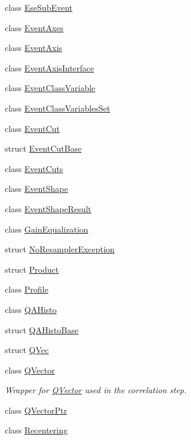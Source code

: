 \begin{DoxyCompactItemize}
class \mbox{\hyperlink{classQn_1_1EseSubEvent}{Ese\+Sub\+Event}}
\item 
class \mbox{\hyperlink{classQn_1_1EventAxes}{Event\+Axes}}
\item 
class \mbox{\hyperlink{classQn_1_1EventAxis}{Event\+Axis}}
\item 
class \mbox{\hyperlink{classQn_1_1EventAxisInterface}{Event\+Axis\+Interface}}
\item 
class \mbox{\hyperlink{classQn_1_1EventClassVariable}{Event\+Class\+Variable}}
\item 
class \mbox{\hyperlink{classQn_1_1EventClassVariablesSet}{Event\+Class\+Variables\+Set}}
\item 
class \mbox{\hyperlink{classQn_1_1EventCut}{Event\+Cut}}
\item 
struct \mbox{\hyperlink{structQn_1_1EventCutBase}{Event\+Cut\+Base}}
\item 
class \mbox{\hyperlink{classQn_1_1EventCuts}{Event\+Cuts}}
\item 
class \mbox{\hyperlink{classQn_1_1EventShape}{Event\+Shape}}
\item 
class \mbox{\hyperlink{classQn_1_1EventShapeResult}{Event\+Shape\+Result}}
\item 
class \mbox{\hyperlink{classQn_1_1GainEqualization}{Gain\+Equalization}}
\item 
struct \mbox{\hyperlink{structQn_1_1NoResamplerException}{No\+Resampler\+Exception}}
\item 
struct \mbox{\hyperlink{structQn_1_1Product}{Product}}
\item 
class \mbox{\hyperlink{classQn_1_1Profile}{Profile}}
\item 
class \mbox{\hyperlink{classQn_1_1QAHisto}{Q\+A\+Histo}}
\item 
struct \mbox{\hyperlink{structQn_1_1QAHistoBase}{Q\+A\+Histo\+Base}}
\item 
struct \mbox{\hyperlink{structQn_1_1QVec}{Q\+Vec}}
\item 
class \mbox{\hyperlink{classQn_1_1QVector}{Q\+Vector}}
\begin{DoxyCompactList}\small\item\em Wrapper for \mbox{\hyperlink{classQn_1_1QVector}{Q\+Vector}} used in the correlation step. \end{DoxyCompactList}\item 
class \mbox{\hyperlink{classQn_1_1QVectorPtr}{Q\+Vector\+Ptr}}
\item 
class \mbox{\hyperlink{classQn_1_1Recentering}{Recentering}}
\item 

\end{DoxyCompactItemize}
